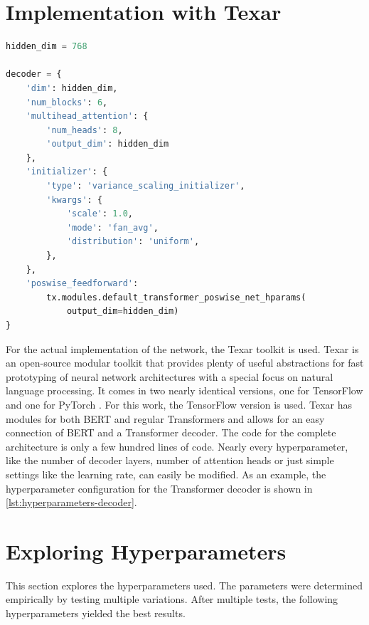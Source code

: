 \section{Implementation with Texar}

\begin{lstlisting}[numbers=none,language=Python,caption={Hyperparameters for Transformer decoder},captionpos=b,label=lst:hyperparameters-decoder]
hidden_dim = 768

decoder = {
    'dim': hidden_dim,
    'num_blocks': 6,
    'multihead_attention': {
        'num_heads': 8,
        'output_dim': hidden_dim
    },
    'initializer': {
        'type': 'variance_scaling_initializer',
        'kwargs': {
            'scale': 1.0,
            'mode': 'fan_avg',
            'distribution': 'uniform',
        },
    },
    'poswise_feedforward': 
        tx.modules.default_transformer_poswise_net_hparams(
            output_dim=hidden_dim)
}
\end{lstlisting}

For the actual implementation of the network, the Texar toolkit \cite{hu2019texar} is used.
Texar is an open-source modular toolkit that provides plenty of useful abstractions for fast prototyping of neural network architectures with a special focus on natural language processing.
It comes in two nearly identical versions, one for TensorFlow \cite{tensorflow2015-whitepaper} and one for PyTorch \cite{NEURIPS2019_9015}.  
For this work, the TensorFlow version is used.
Texar has modules for both BERT and regular Transformers and allows for an easy connection of BERT and a Transformer decoder.
The code for the complete architecture is only a few hundred lines of code.
Nearly every hyperparameter, like the number of decoder layers, number of attention heads or just simple settings like the learning rate, can easily be modified.
As an example, the hyperparameter configuration for the Transformer decoder is shown in \cref{lst:hyperparameters-decoder}.


\section{Exploring Hyperparameters}

This section explores the hyperparameters used.
The parameters were determined empirically by testing multiple variations.
After multiple tests, the following hyperparameters yielded the best results.

